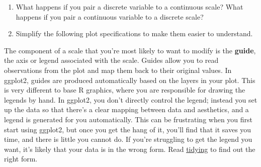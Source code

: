 \begin{enumerate}
\def\labelenumi{\arabic{enumi}.}
\item
  What happens if you pair a discrete variable to a continuous scale?
  What happens if you pair a continuous variable to a discrete scale?
\item
  Simplify the following plot specifications to make them easier to
  understand.

\begin{Shaded}
\begin{Highlighting}[]
\StringTok{ }
\StringTok{  }\NormalTok{(}\NormalTok{) +}\StringTok{ }
\StringTok{  }\NormalTok{() +}
\StringTok{  }\NormalTok{(}\NormalTok{(} 

\NormalTok{(}  \StringTok{ }
\StringTok{  }\NormalTok{(}\NormalTok{) +}\StringTok{ }
\StringTok{  }\NormalTok{(}\NormalTok{) +}
\StringTok{  }\NormalTok{(}\NormalTok{) +}\StringTok{ }
\StringTok{  }\NormalTok{() +}\StringTok{ }
\StringTok{  }\NormalTok{(}\NormalTok{(} \StringTok{ }
\StringTok{  }\NormalTok{(}\NormalTok{)}
\end{Highlighting}
\end{Shaded}
\end{enumerate}


The component of a scale that you're most likely to want to modify is
the \textbf{guide}, the axis or legend associated with the scale. Guides
allow you to read observations from the plot and map them back to their
original values. In ggplot2, guides are produced automatically based on
the layers in your plot. This is very different to base R graphics,
where you are responsible for drawing the legends by hand. In ggplot2,
you don't directly control the legend; instead you set up the data so
that there's a clear mapping between data and aesthetics, and a legend
is generated for you automatically. This can be frustrating when you
first start using ggplot2, but once you get the hang of it, you'll find
that it saves you time, and there is little you cannot do. If you're
struggling to get the legend you want, it's likely that your data is in
the wrong form. Read \hyperref[cha:data]{tidying} to find out the right
form.

